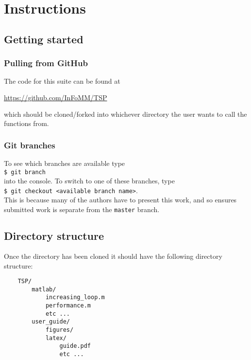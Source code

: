 \section{Instructions}
\label{sec:intructions}


\subsection{Getting started}
\label{subsec:getting_started}

\subsubsection{Pulling from GitHub}
\label{subsubsec:pulling_from_github}

The code for this suite can be found at 
\begin{center}
\href{https://github.com/InFoMM/TSP}{https://github.com/InFoMM/TSP}
\end{center}
which should be cloned/forked into whichever directory the user wants to call the functions from.

\subsubsection{Git branches}
\label{subsubsec:git_branches}

To see which branches are available type \\
\indent
\verb|$ git branch| \\
into the console. To switch to one of these branches, type \\
\indent
\verb|$ git checkout <available branch name>|. \\
This is because many of the authors have to present this work, and so ensures submitted work is separate from the \texttt{master} branch.

\subsection{Directory structure}
\label{subsec:directory_structure}

Once the directory has been cloned it should have the following directory structure:
\\
\noindent
\begin{minipage}{\linewidth}
\begin{verbatim}
    TSP/
        matlab/
            increasing_loop.m
            performance.m
            etc ...
        user_guide/
            figures/
            latex/
                guide.pdf
                etc ...
\end{verbatim}
\end{minipage}
\\
\noindent

